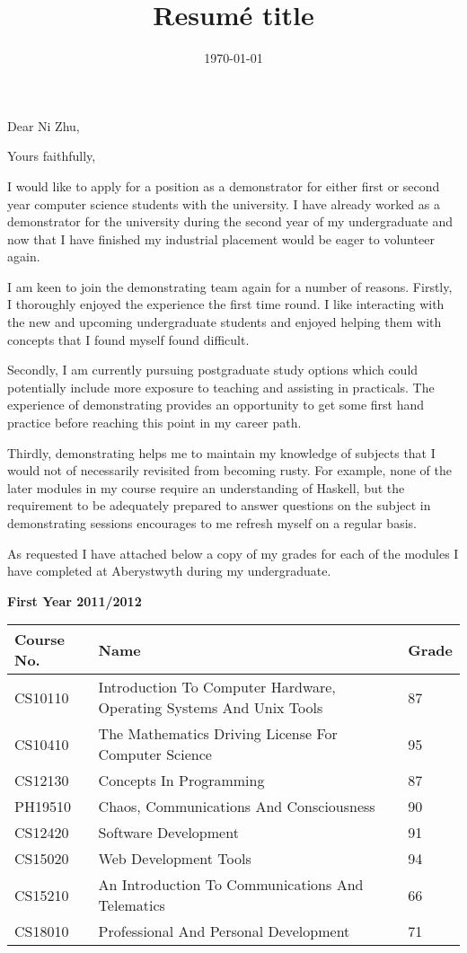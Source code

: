 \documentclass[11pt,a4paper,sans]{moderncv}        %
\title{Resumé title}                               %
\begin{document}
\date{\today}
\opening{Dear Ni Zhu,}
\closing{Yours faithfully,}
\makelettertitle

I would like to apply for a position as a demonstrator for either first or second year computer science students with the university. I have already worked as a demonstrator for the university during the second year of my undergraduate and now that I have finished my industrial placement would be eager to volunteer again.

I am keen to join the demonstrating team again for a number of reasons. Firstly, I thoroughly enjoyed the experience the first time round. I like interacting with the new and upcoming undergraduate students and enjoyed helping them with concepts that I found myself found difficult. 

Secondly, I am currently pursuing postgraduate study options which could potentially include more exposure to teaching and assisting in practicals. The experience of demonstrating provides an opportunity to get some first hand practice before reaching this point in my career path.

Thirdly, demonstrating helps me to maintain my knowledge of subjects that I would not of necessarily revisited from becoming rusty. For example, none of the later modules in my course require an understanding of Haskell, but the requirement to be adequately prepared to answer questions on the subject in demonstrating sessions encourages to me refresh myself on a regular basis.

As requested I have attached below a copy of my grades for each of the modules I have completed  at Aberystwyth during my undergraduate.

\textbf{First Year 2011/2012}
\begin{center}
    \begin{tabular}{| l | l | l |}
    \hline
    Course No. & Name & Grade \\ \hline
CS10110 & Introduction To Computer Hardware, Operating Systems And Unix Tools &	87 \\ \hline
CS10410 & The Mathematics Driving License For Computer Science & 95	\\ \hline
CS12130 & Concepts In Programming & 87 \\ \hline
PH19510 & Chaos, Communications And Consciousness & 90	\\ \hline
CS12420 & Software Development & 91	\\ \hline
CS15020 & Web Development Tools & 94	\\ \hline
CS15210 & An Introduction To Communications And Telematics & 66	\\ \hline
CS18010 & Professional And Personal Development & 71 \\ \hline
    \end{tabular}
\end{center}
\end{document}
